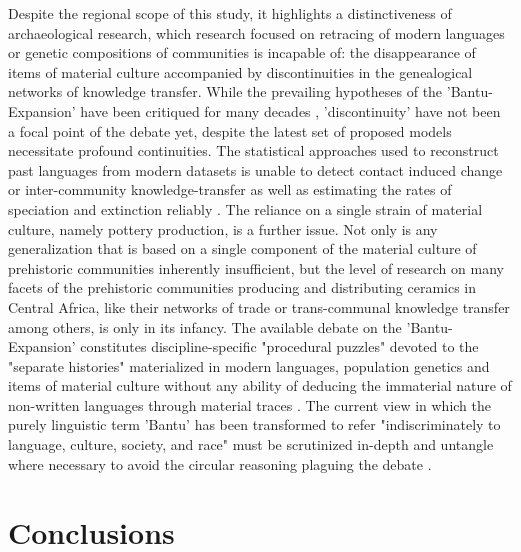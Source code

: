 \documentclass[smallextended,natbib]{svjour3}       %
\begin{document}
Despite the regional scope of this study, it highlights a distinctiveness of archaeological research, which research focused on retracing of modern languages or genetic compositions of communities is incapable of: the disappearance of items of material culture accompanied by discontinuities in the genealogical networks of knowledge transfer. While the prevailing hypotheses of the 'Bantu-Expansion' have been critiqued for many decades \citep{deMaret.1989,Robertson.2000,Eggert.2005,Eggert.2016a}, 'discontinuity' have not been a focal point of the debate yet, despite the latest set of proposed models \citep{Bostoen.2015,Grollemund.2015,Grollemund.2023,Koile.2022} necessitate profound continuities. The statistical approaches used to reconstruct past languages from modern datasets is unable to detect contact induced change \cite[86]{Eggert.2016a} or inter-community knowledge-transfer as well as estimating the rates of speciation and extinction reliably \citep{Pagel.2020}. The reliance on a single strain of material culture, namely pottery production, is a further issue. Not only is any generalization that is based on a single component of the material culture of prehistoric communities inherently insufficient, but the level of research on many facets of the prehistoric communities producing and distributing ceramics in Central Africa, like their networks of trade or trans-communal knowledge transfer among others, is only in its infancy. The available debate on the 'Bantu-Expansion' constitutes discipline-specific "procedural puzzles" \citep[88]{Eggert.2016a} devoted to the "separate histories" materialized in modern languages, population genetics \citep{FortesLima.2024} and items of material culture without any ability of deducing the immaterial nature of non-written languages through material traces \citep[85]{Eggert.2016a}. The current view in which the purely linguistic term 'Bantu' has been transformed to refer "indiscriminately to language, culture, society, and race" \citep[302]{Eggert.2005} must be scrutinized in-depth and untangle where necessary to avoid the circular reasoning plaguing the debate \citep{Ehret.1973,Phillipson.1976,Phillipson.1976b,Phillipson.1977a,Heine.1977,Bostoen.2015,Grollemund.2015,Grollemund.2023,Koile.2022}.

\section{Conclusions}
\end{document}

